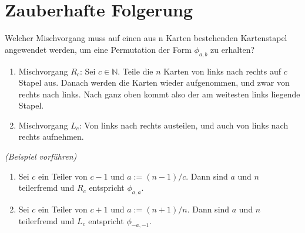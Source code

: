 \documentclass[a4paper]{article}
\begin{document}
    \section{Zauberhafte Folgerung}
    \begin{bemerkung}
    Welcher Mischvorgang muss auf einen aus n Karten bestehenden Kartenstapel angewendet werden, um eine Permutation der Form $\phi_{a,b}$ zu erhalten? 
     \end{bemerkung}
    \begin{enumerate}
    \item Mischvorgang $R_c$: Sei $c \in \mathbb{N}$. Teile die $n$ Karten von links nach rechts auf $c$ Stapel aus. Danach werden die Karten wieder aufgenommen, und zwar von rechts nach links. Nach ganz oben kommt also der am weitesten links liegende Stapel.
    \item Mischvorgang $L_c$: Von links nach rechts austeilen, und auch von links nach rechts aufnehmen.
    \end{enumerate}
    \textit{(Beispiel vorführen)}
    \begin{definition} 
   
    \begin{enumerate}
    \item Sei $c$ ein Teiler von $c - 1$ und $a := (n - 1)/c$. Dann sind $a$ und $n$ teilerfremd und $R_c$ entspricht $\phi_{a,a}$.
    \item Sei $c$ ein Teiler von $c + 1$ und $a := (n + 1)/n$. Dann sind $a$ und $n$ teilerfremd und $L_c$ entspricht $\phi_{-a,-1}$.
    \end{enumerate}
    \end{definition}
    \vspace{2mm}
\end{document}
